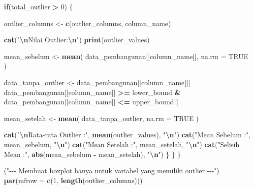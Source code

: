 \documentclass[
  12pt,
]{article}
\newenvironment{Shaded}{\begin{snugshade}}{\end{snugshade}}
\newcommand{\AttributeTok}[1]{\textcolor[rgb]{0.13,0.29,0.53}{#1}}
\newcommand{\ConstantTok}[1]{\textcolor[rgb]{0.56,0.35,0.01}{#1}}
\newcommand{\ControlFlowTok}[1]{\textcolor[rgb]{0.13,0.29,0.53}{\textbf{#1}}}
\newcommand{\DecValTok}[1]{\textcolor[rgb]{0.00,0.00,0.81}{#1}}
\newcommand{\FunctionTok}[1]{\textcolor[rgb]{0.13,0.29,0.53}{\textbf{#1}}}
\newcommand{\NormalTok}[1]{#1}
\newcommand{\OtherTok}[1]{\textcolor[rgb]{0.56,0.35,0.01}{#1}}
\newcommand{\SpecialCharTok}[1]{\textcolor[rgb]{0.81,0.36,0.00}{\textbf{#1}}}
\newcommand{\StringTok}[1]{\textcolor[rgb]{0.31,0.60,0.02}{#1}}
\begin{document}
\begin{Shaded}
\begin{Highlighting}[]
    \ControlFlowTok{if}\NormalTok{(total\_outlier }\SpecialCharTok{\textgreater{}} \DecValTok{0}\NormalTok{) \{}
  
\NormalTok{      outlier\_columns }\OtherTok{\textless{}{-}} \FunctionTok{c}\NormalTok{(outlier\_columns, column\_name)}
  
      \FunctionTok{cat}\NormalTok{(}\StringTok{"}\SpecialCharTok{\textbackslash{}n}\StringTok{Nilai Outlier:}\SpecialCharTok{\textbackslash{}n}\StringTok{"}\NormalTok{)}
      \FunctionTok{print}\NormalTok{(outlier\_values)}
  
\NormalTok{      mean\_sebelum }\OtherTok{\textless{}{-}} \FunctionTok{mean}\NormalTok{(}
\NormalTok{        data\_pembangunan[[column\_name]],}
        \AttributeTok{na.rm =} \ConstantTok{TRUE}
\NormalTok{      )}
  
\NormalTok{      data\_tanpa\_outlier }\OtherTok{\textless{}{-}}\NormalTok{ data\_pembangunan[[column\_name]][}
\NormalTok{        data\_pembangunan[[column\_name]] }\SpecialCharTok{\textgreater{}=}\NormalTok{ lower\_bound }\SpecialCharTok{\&}
\NormalTok{        data\_pembangunan[[column\_name]] }\SpecialCharTok{\textless{}=}\NormalTok{ upper\_bound}
\NormalTok{      ]}
  
\NormalTok{      mean\_setelah }\OtherTok{\textless{}{-}} \FunctionTok{mean}\NormalTok{(}
\NormalTok{        data\_tanpa\_outlier,}
        \AttributeTok{na.rm =} \ConstantTok{TRUE}
\NormalTok{      )}
  
      \FunctionTok{cat}\NormalTok{(}\StringTok{"}\SpecialCharTok{\textbackslash{}n}\StringTok{Rata{-}rata Outlier :"}\NormalTok{, }\FunctionTok{mean}\NormalTok{(outlier\_values), }\StringTok{"}\SpecialCharTok{\textbackslash{}n}\StringTok{"}\NormalTok{)}
      \FunctionTok{cat}\NormalTok{(}\StringTok{"Mean Sebelum :"}\NormalTok{, mean\_sebelum, }\StringTok{"}\SpecialCharTok{\textbackslash{}n}\StringTok{"}\NormalTok{)}
      \FunctionTok{cat}\NormalTok{(}\StringTok{"Mean Setelah :"}\NormalTok{, mean\_setelah, }\StringTok{"}\SpecialCharTok{\textbackslash{}n}\StringTok{"}\NormalTok{)}
      \FunctionTok{cat}\NormalTok{(}\StringTok{"Selisih Mean :"}\NormalTok{, }\FunctionTok{abs}\NormalTok{(mean\_sebelum }\SpecialCharTok{{-}}\NormalTok{ mean\_setelah), }\StringTok{"}\SpecialCharTok{\textbackslash{}n}\StringTok{"}\NormalTok{)}
\NormalTok{    \}}
\NormalTok{  \}}
\NormalTok{\}}

\NormalTok{(}\StringTok{"{-}{-}{-} Membuat boxplot hanya untuk variabel yang memiliki outlier {-}{-}{-}"}\NormalTok{)}
\FunctionTok{par}\NormalTok{(}\AttributeTok{mfrow =} \FunctionTok{c}\NormalTok{(}\DecValTok{1}\NormalTok{, }\FunctionTok{length}\NormalTok{(outlier\_columns)))}


\end{Highlighting}
\end{Shaded}
\end{document}
